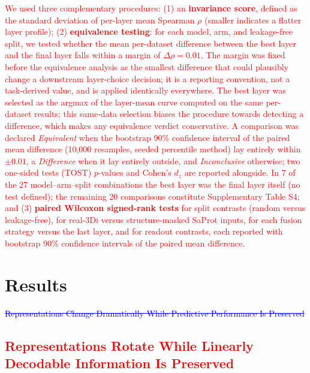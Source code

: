 \documentclass[11pt,a4paper]{article}
\newcommand{\rev}[1]{\textcolor{red}{#1}}
\begin{document}
\textcolor{red}{We used three complementary procedures: (1) an \textbf{invariance score}, defined
as the standard deviation of per-layer mean Spearman $\rho$ (smaller indicates a
flatter layer profile);
\rev{(2) \textbf{equivalence testing}: for each model, arm, and leakage-free
split, we tested whether the mean per-dataset difference between the best layer
and the final layer falls within a margin of $\Delta\rho = 0.01$. The margin was
fixed before the equivalence analysis as the smallest difference that could
plausibly change a downstream layer-choice decision; it is a reporting
convention, not a task-derived value, and is applied identically everywhere.
The best layer was selected as the argmax of the layer-mean curve computed on
the same per-dataset results; this same-data selection biases the procedure
towards detecting a difference, which makes any equivalence verdict
conservative. A comparison was declared \emph{Equivalent} when the bootstrap
90\% confidence interval of the paired mean difference (10{,}000 resamples,
seeded percentile method) lay entirely within $\pm 0.01$, a \emph{Difference}
when it lay entirely outside, and \emph{Inconclusive} otherwise; two one-sided
tests (TOST) $p$-values and Cohen's $d_z$ are reported alongside. In 7 of the
27 model--arm--split combinations the best layer was the final layer itself
(no test defined); the remaining 20 comparisons constitute Supplementary Table
S4; and (3) \textbf{paired Wilcoxon signed-rank tests} for split contrasts
(random versus leakage-free), for real-3Di versus structure-masked SaProt
inputs, for each fusion strategy versus the last layer, and for readout
contrasts, each reported with bootstrap 90\% confidence intervals of the paired
mean difference.}}

\section{Results}

\textcolor{blue}{\sout{Representations Change Dramatically While Predictive Performance Is Preserved}}

\textcolor{red}{\subsection{Representations Rotate While Linearly Decodable Information Is Preserved}}
\end{document}
